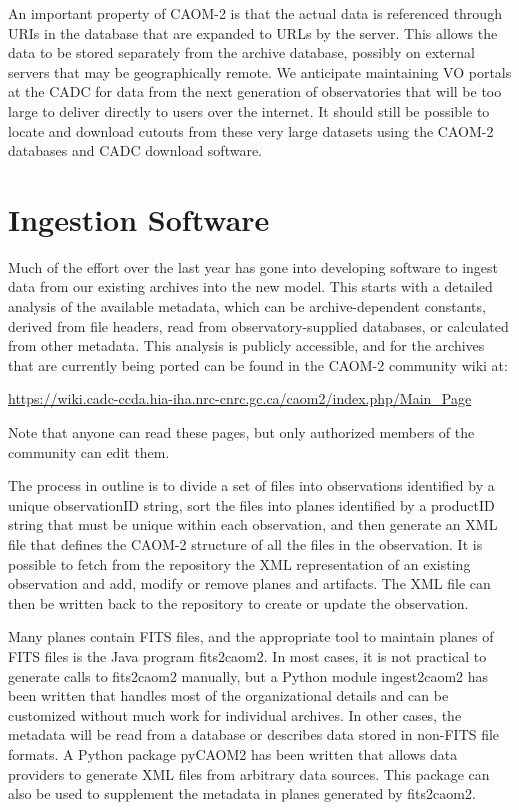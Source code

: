 An important property of CAOM-2 is that the actual data is referenced through URIs in the database that are expanded to URLs by the server.  This allows the data to be stored separately from the archive database, possibly on external servers that may be geographically remote.  We anticipate maintaining VO portals at the CADC for data from the next generation of observatories that will be too large to deliver directly to users over the internet.  It should still be possible to locate and download cutouts from these very large datasets using the CAOM-2 databases and CADC download software.

\section{Ingestion Software}
Much of the effort over the last year has gone into developing software to ingest data from our existing archives into the new model.  This starts with a detailed analysis of the available metadata, which can be archive-dependent constants, derived from file headers, read from observatory-supplied databases, or calculated from other metadata.  This analysis is publicly accessible, and for the archives that are currently being ported can be found in the CAOM-2 community wiki at: 
\begin{center}
{\small \url{https://wiki.cadc-ccda.hia-iha.nrc-cnrc.gc.ca/caom2/index.php/Main_Page}}  
\end{center}
Note that anyone can read these pages, but only authorized members of the community can edit them.  

The process in outline is to divide a set of files into observations identified by a unique observationID string, sort the files into planes identified by a productID string that must be unique within each observation, and then generate an XML file that defines the CAOM-2 structure of all the files in the observation.  It is possible to fetch from the repository the XML representation of an existing observation and add, modify or remove planes and artifacts.  The XML file can then be written back to the repository to create or update the observation.

Many planes contain FITS files, and the appropriate tool to maintain planes of FITS files is the Java program fits2caom2.  In most cases, it is not practical to generate calls to fits2caom2 manually, but a Python module ingest2caom2 has been written that handles most of the organizational details and can be customized without much work for individual archives.  In other cases, the metadata will be read from a database or describes data stored in non-FITS file formats.  A Python package pyCAOM2 has been written that allows data providers to generate XML files from arbitrary data sources.  This package can also be used to supplement the metadata in planes generated by fits2caom2.  

